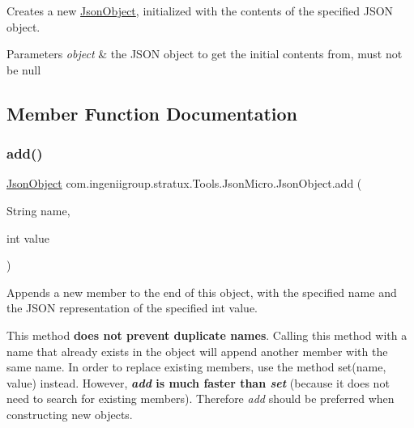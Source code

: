 Creates a new \hyperlink{classcom_1_1ingeniigroup_1_1stratux_1_1_tools_1_1_json_micro_1_1_json_object}{Json\+Object}, initialized with the contents of the specified J\+S\+ON object.


\begin{DoxyParams}{Parameters}
{\em object} & the J\+S\+ON object to get the initial contents from, must not be {\ttfamily null} \\
\hline
\end{DoxyParams}


\subsection{Member Function Documentation}
\mbox{\label{classcom_1_1ingeniigroup_1_1stratux_1_1_tools_1_1_json_micro_1_1_json_object_a47b749efc43f3135b9b8e8bfaf00170a}} 
\subsubsection{\texorpdfstring{add()}{add()}\hspace{0.1cm}{\footnotesize\ttfamily [1/7]}}
{\footnotesize\ttfamily \hyperlink{classcom_1_1ingeniigroup_1_1stratux_1_1_tools_1_1_json_micro_1_1_json_object}{Json\+Object} com.\+ingeniigroup.\+stratux.\+Tools.\+Json\+Micro.\+Json\+Object.\+add (\begin{DoxyParamCaption}\item[{String}]{name,  }\item[{int}]{value }\end{DoxyParamCaption})}

Appends a new member to the end of this object, with the specified name and the J\+S\+ON representation of the specified {\ttfamily int} value. 

This method {\bfseries does not prevent duplicate names}. Calling this method with a name that already exists in the object will append another member with the same name. In order to replace existing members, use the method {\ttfamily set(name, value)} instead. However, {\bfseries  {\itshape add} is much faster than {\itshape set}} (because it does not need to search for existing members). Therefore {\itshape add} should be preferred when constructing new objects. 


